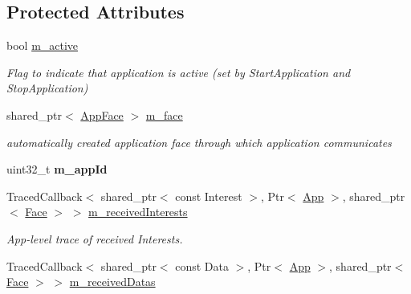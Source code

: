\subsection*{Protected Attributes}
\begin{DoxyCompactItemize}
\item 
bool \hyperlink{classns3_1_1ndn_1_1App_a098c5a782a53ecdbb1e0163a563a38fd}{m\+\_\+active}\hypertarget{classns3_1_1ndn_1_1App_a098c5a782a53ecdbb1e0163a563a38fd}{}\label{classns3_1_1ndn_1_1App_a098c5a782a53ecdbb1e0163a563a38fd}

\begin{DoxyCompactList}\small\item\em Flag to indicate that application is active (set by Start\+Application and Stop\+Application) \end{DoxyCompactList}\item 
shared\+\_\+ptr$<$ \hyperlink{classns3_1_1ndn_1_1AppFace}{App\+Face} $>$ \hyperlink{classns3_1_1ndn_1_1App_a846e29a550aaa76e39a74fbaf6c1e50a}{m\+\_\+face}\hypertarget{classns3_1_1ndn_1_1App_a846e29a550aaa76e39a74fbaf6c1e50a}{}\label{classns3_1_1ndn_1_1App_a846e29a550aaa76e39a74fbaf6c1e50a}

\begin{DoxyCompactList}\small\item\em automatically created application face through which application communicates \end{DoxyCompactList}\item 
uint32\+\_\+t {\bfseries m\+\_\+app\+Id}\hypertarget{classns3_1_1ndn_1_1App_aabacad975c11d34dbc564532fc831694}{}\label{classns3_1_1ndn_1_1App_aabacad975c11d34dbc564532fc831694}

\item 
Traced\+Callback$<$ shared\+\_\+ptr$<$ const Interest $>$, Ptr$<$ \hyperlink{classns3_1_1ndn_1_1App}{App} $>$, shared\+\_\+ptr$<$ \hyperlink{classnfd_1_1Face}{Face} $>$ $>$ \hyperlink{classns3_1_1ndn_1_1App_ab11ae6b76b847ff28bfc7ea3a782ab26}{m\+\_\+received\+Interests}\hypertarget{classns3_1_1ndn_1_1App_ab11ae6b76b847ff28bfc7ea3a782ab26}{}\label{classns3_1_1ndn_1_1App_ab11ae6b76b847ff28bfc7ea3a782ab26}

\begin{DoxyCompactList}\small\item\em App-\/level trace of received Interests. \end{DoxyCompactList}\item 
Traced\+Callback$<$ shared\+\_\+ptr$<$ const Data $>$, Ptr$<$ \hyperlink{classns3_1_1ndn_1_1App}{App} $>$, shared\+\_\+ptr$<$ \hyperlink{classnfd_1_1Face}{Face} $>$ $>$ \hyperlink{classns3_1_1ndn_1_1App_a1c7d1cec740ce060d5603bc82b85974e}{m\+\_\+received\+Datas}\hypertarget{classns3_1_1ndn_1_1App_a1c7d1cec740ce060d5603bc82b85974e}{}\label{classns3_1_1ndn_1_1App_a1c7d1cec740ce060d5603bc82b85974e}


\end{DoxyCompactItemize}
